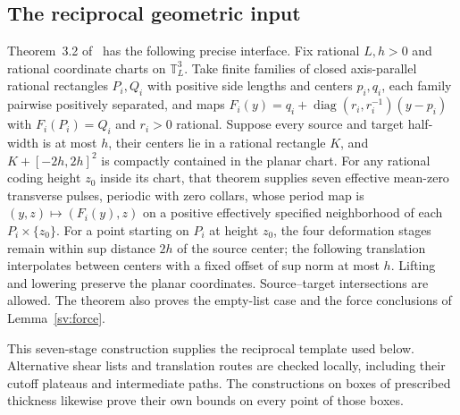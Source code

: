 \subsection{The reciprocal geometric input}
Theorem~3.2 of~\cite{Entry} has the following precise interface.
Fix rational $L,h>0$ and rational coordinate charts on $\mathbb T_L^3$.
Take finite families of closed axis-parallel rational rectangles $P_i,Q_i$
with positive side lengths and centers $p_i,q_i$, each family pairwise
positively separated, and maps
$F_i(y)=q_i+\operatorname{diag}(r_i,r_i^{-1})(y-p_i)$ with
$F_i(P_i)=Q_i$ and $r_i>0$ rational.  Suppose every source and target
half-width is at most $h$, their centers lie in a rational rectangle
$K$, and $K+[-2h,2h]^2$ is compactly contained in the planar chart.
For any rational coding height $z_0$ inside its chart, that theorem supplies
seven effective mean-zero transverse pulses, periodic with zero collars,
whose period map is $(y,z)\mapsto(F_i(y),z)$ on a positive
effectively specified neighborhood of each $P_i\times\{z_0\}$.  For a point
starting on $P_i$ at height $z_0$, the four deformation stages
remain within sup distance $2h$ of the source center;
the following translation interpolates between centers with a fixed
offset of sup norm at most $h$.  Lifting and lowering preserve the planar
coordinates.  Source--target intersections are allowed.  The theorem
also proves the empty-list case and the force conclusions of
Lemma~\ref{sv:force}.

This seven-stage construction supplies the reciprocal template used below.
Alternative shear lists and translation routes are checked locally,
including their cutoff plateaus and intermediate paths.  The constructions
on boxes of prescribed thickness likewise prove their own bounds on every
point of those boxes.
